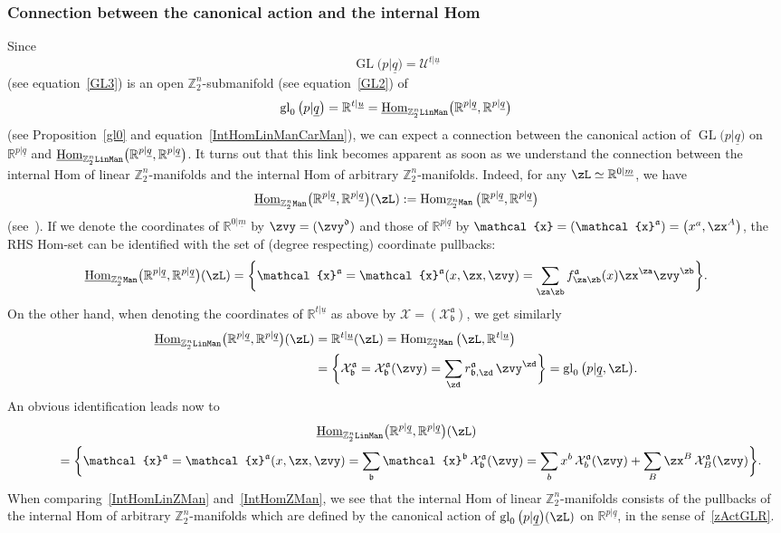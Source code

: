 \documentclass[10pt,a4paper]{amsart}
\newcommand{\op}[1]{\operatorname{#1}}
\newcommand{\R}{{\mathbb R}}
\newcommand{\Z}{{\mathbb Z}}
\def\ul{\underline}
\def\ul{\underline}
\newcommand{\0}{\otimes}
\newcommand{\z}{\Z_2^n}
\numberwithin{equation}{section}
\begin{document}
\subsubsection{Connection between the canonical action and the internal Hom} Since
\[
\op{GL}\big(p|\ul q\big)=\mathcal{U}^{t|\ul u}
\]
(see equation~\eqref{GL3}) is an open $\z$-submanifold (see equation~\eqref{GL2}) of
\[
\op{gl}_0\big(p|\ul q\big)=\R^{t|\ul u}=\ul{\op{Hom}}_{\z{\tt LinMan}}\big(\R^{p|\ul q},\R^{p|\ul q}\big)
\]
(see Proposition~\ref{gl0} and equation~\eqref{IntHomLinManCarMan}), we can expect a connection between the canonical action of $\op{GL}\big(p|\ul q\big)$ on $\R^{p|\ul q}$ and $\ul{\op{Hom}}_{\z{\tt LinMan}}\big(\R^{p|\ul q},\R^{p|\ul q}\big)$. It turns out that this link becomes apparent as soon as we understand the connection between the internal Hom of linear $\z$-manifolds and the internal Hom of arbitrary $\z$-manifolds. Indeed, for any $\zL\simeq\R^{0|\ul m}$, we have
\[
\ul{\op{Hom}}_{\z{\tt Man}}\big(\R^{p|\ul q},\R^{p|\ul q}\big)(\zL):=\op{Hom}_{\z{\tt Man}}\big(\R^{p|\ul q},\R^{p|\ul q}\big)
\]
(see~\cite{Bruce:2019b}). If we denote the coordinates of $\R^{0|\ul m}$ by $\zvy=(\zvy^{\mathfrak{d}})$ and those of $\R^{p|\ul q}$ by $\mathcal{x}=(\mathcal{x}^{\mathfrak{a}})=\big(x^a,\zx^A\big)$, the {\small RHS} Hom-set can be identified with the set of (degree respecting) coordinate pullbacks:
\[
\ul{\op{Hom}}_{\z{\tt Man}}\big(\R^{p|\ul q},\R^{p|\ul q}\big)(\zL)=\bigg\{\mathcal{x}^{\mathfrak{a}}=\mathcal{x}^{\mathfrak{a}}(x,\zx,\zvy) =\sum_{\za\zb}f^{\mathfrak{a}}_{\za\zb}(x)\zx^\za\zvy^\zb\bigg\}.
\]
On the other hand, when denoting the coordinates of $\R^{t|\ul u}$ as above by $\mathcal{X}=(\mathcal{X}^{\mathfrak{a}}_{\mathfrak{b}})$, we get similarly
\begin{align}
\ul{\op{Hom}}_{\z{\tt LinMan}}\big(\R^{p|\ul q},\R^{p|\ul q}\big)(\zL)&=\R^{t|\ul u}(\zL)=\op{Hom}_{\z{\tt Man}}\big(\zL,\R^{t|\ul u}\big)\nonumber
\\
&=\bigg\{\mathcal{X}^{\mathfrak{a}}_{\mathfrak{b}}=\mathcal{X}^{\mathfrak{a}}_{\mathfrak{b}}(\zvy)=\sum_\zd r^{\mathfrak{a}}_{\mathfrak{b},\zd}\,\zvy^\zd\bigg\}
=\op{gl}_0\big(p|\ul q,\zL\big).\label{IntHomZMan}
\end{align}
An obvious identification leads now to
\begin{gather}
\ul{\op{Hom}}_{\z{\tt LinMan}}\big(\R^{p|\ul q},\R^{p|\ul q}\big)(\zL)\nonumber
\\ \qquad
{}=\bigg\{\mathcal{x}^{\mathfrak{a}}=\mathcal{x}^{\mathfrak{a}}(x,\zx,\zvy)
=\sum_{\mathfrak{b}}\mathcal{x}^{\mathfrak{b}}\,\mathcal{X}^{\mathfrak{a}}_{\mathfrak{b}}(\zvy)=
\sum_{b}x^b\,\mathcal{X}^{\mathfrak{a}}_{b}(\zvy)+\sum_B\zx^B\,\mathcal{X}^{\mathfrak{a}}_{B}(\zvy)\bigg\}.
\label{IntHomLinZMan}
\end{gather}
When comparing~\eqref{IntHomLinZMan} and~\eqref{IntHomZMan}, we see that the internal Hom of linear $\z$-manifolds consists of the pullbacks of the internal Hom of arbitrary $\z$-manifolds which are defined by the canonical action of $\op{gl}_0\big(p|\ul q\big)(\zL)$ on $\R^{p|\ul q}$, in the sense of~\eqref{zActGLR}.
\end{document}
